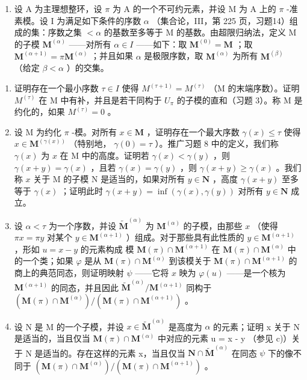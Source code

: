 \begin{enumerate}
\def\labelenumi{\arabic{enumi})}
\setcounter{enumi}{12}
\tightlist
\item
  设 A 为主理想整环，设 \(\pi\) 为 A 的一个不可约元素，并设 M 为 A 上的 \(\pi\) -准素模。设 I 为满足如下条件的序数 \(\alpha\) （集合论，III，第 225 页，习题14）组成的集：序数之集 \(< \alpha\) 的基数至多等于 M 的基数。由超限归纳法，定义 M 的子模 \(\mathbf{M}^{(\alpha)}\) ——对所有 \(\alpha \in I\) ——如下：取 \(\mathbf{M}^{(0)} = \mathbf{M}\) ；取 \(\mathbf{M}^{(\alpha + 1)} = \pi \mathbf{M}^{(\alpha)}\) ；并且如果 \(\alpha\) 是极限序数，取 \(\mathbf{M}^{(\alpha)}\) 为所有 \(\mathbf{M}^{(\beta)}\) （给定 \(\beta < \alpha\) ）的交集。
\end{enumerate}

\begin{enumerate}
\def\labelenumi{\alph{enumi})}
\item
  证明存在一个最小序数 \(\tau \in I\) 使得 \(M^{(\tau + 1)} = M^{(\tau)}\) （M 的末端序数）。证明 \(M^{(\tau)}\) 在 M 中有补，并且是若干同构于 \(U_{\pi}\) 的子模的直和（习题 3）。称 M 是约化的，如果 \(M^{(\tau)} = 0\) 。
\item
  设 M 为约化 \(\pi\) -模。对所有 \(x \in \mathbf{M}\) ，证明存在一个最大序数 \(\gamma(x) \leqslant \tau\) 使得 \(x \in \mathbf{M}^{(\gamma(x))}\) （特别地， \(\gamma(0) = \tau\) ）。推广习题 8 中的定义，我们称 \(\gamma(x)\) 为 \(x\) 在 M 中的高度。证明若 \(\gamma(x) < \gamma(y)\) ，则 \(\gamma(x + y) = \gamma(x)\) ，且若 \(\gamma(x) = \gamma(y)\) ，则 \(\gamma(x + y) \geqslant \gamma(x)\) 。我们称 \(x\) 关于 M 的子模 N 是适当的，如果对所有 \(y \in \mathbf{N}\) ，高度 \(\gamma(x + y)\) 至多等于 \(\gamma(x)\) ；证明此时 \(\gamma(x + y) = \inf(\gamma(x), \gamma(y))\) 对所有 \(y \in \mathbf{N}\) 成立。
\item
  设 \(\alpha < \tau\) 为一个序数，并设 \(\tilde{\mathbf{M}}^{(\alpha)}\) 为 \(\mathbf{M}^{(\alpha)}\) 的子模，由那些 \(x\) （使得 \(\pi x = \pi y\) 对某个 \(y \in \mathbf{M}^{(\alpha + 1)}\) ）组成。对于那些具有此性质的 \(y \in \mathbf{M}^{(\alpha + 1)}\) ，形如 \(u = x - y\) 的元素构成 模 \(\mathbf{M}(\pi) \cap \mathbf{M}^{(\alpha + 1)}\) 在 \(\mathbf{M}(\pi) \cap \mathbf{M}^{(\alpha)}\) 中的一个类；如果 \(\varphi\) 是从 \(\mathbf{M}(\pi) \cap \mathbf{M}^{(\alpha)}\) 到该模关于 \(\mathbf{M}(\pi) \cap \mathbf{M}^{(\alpha + 1)}\) 的商上的典范同态，则证明映射 \(\psi\) ——它将 \(x\) 映为 \(\varphi(u)\) ——是一个核为 \(\mathbf{M}^{(\alpha + 1)}\) 的同态，并且因此 \(\tilde{\mathbf{M}}^{(\alpha)} / \mathbf{M}^{(\alpha + 1)}\) 同构于 \((\mathbf{M}(\pi) \cap \mathbf{M}^{(\alpha)}) / (\mathbf{M}(\pi) \cap \mathbf{M}^{(\alpha + 1)})\) 。
\item
  设 N 是 M 的一个子模，并设 \(x \in \tilde{\mathbf{M}}^{(\alpha)}\) 是高度为 \(\alpha\) 的元素；证明 x 关于 N 是适当的，当且仅当 \(\mathbf{M}(\pi) \cap \mathbf{M}^{(\alpha)}\) 中对应的元素 u = x - y （参见 c)）关于 N 是适当的。存在这样的元素 x，当且仅当 \(\mathbf{N} \cap \tilde{\mathbf{M}}^{(\alpha)}\) 在同态 \(\psi\) 下的像不同于 \((\mathbf{M}(\pi) \cap \mathbf{M}^{(\alpha)}) / (\mathbf{M}(\pi) \cap \mathbf{M}^{(\alpha + 1)})\) 。
\end{enumerate}

